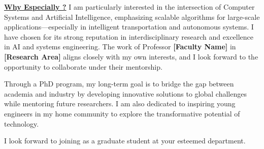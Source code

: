
\textbf{\underline{Why Especially \GetUniversityAbbr?}}
I am particularly interested in the intersection of Computer Systems and Artificial Intelligence, emphasizing scalable algorithms
for large-scale applications—especially in intelligent transportation and autonomous systems.
I have chosen \GetUniversityName for its strong reputation in interdisciplinary research and excellence in AI and systems engineering.
The work of Professor \textbf{[Faculty Name]} in \textbf{[Research Area]} aligns closely with my own interests,
and I look forward to the opportunity to collaborate under their mentorship.

Through a PhD program, my long-term goal is to bridge the gap between academia and industry
by developing innovative solutions to global challenges while mentoring future researchers.
I am also dedicated to inspiring young engineers in my home community to explore the transformative potential of technology.

I look forward to joining \GetUniversityName as a graduate student at your esteemed department.